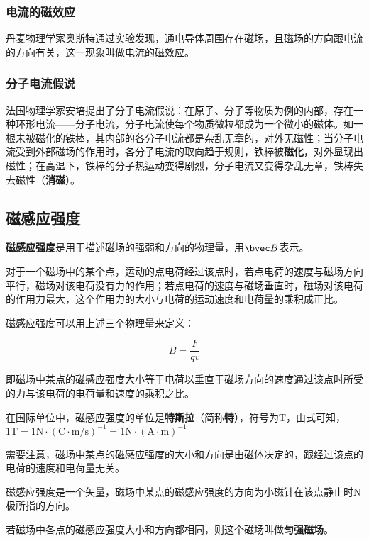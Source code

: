 \subsubsection{电流的磁效应}

丹麦物理学家奥斯特通过实验发现，通电导体周围存在磁场，且磁场的方向跟电流的方向有关，这一现象叫做电流的磁效应。

\subsubsection{分子电流假说}

法国物理学家安培提出了分子电流假说：在原子、分子等物质为例的内部，存在一种环形电流——分子电流，分子电流使每个物质微粒都成为一个微小的磁体。如一根未被磁化的铁棒，其内部的各分子电流都是杂乱无章的，对外无磁性；当分子电流受到外部磁场的作用时，各分子电流的取向趋于规则，铁棒被\textbf{磁化}，对外显现出磁性；在高温下，铁棒的分子热运动变得剧烈，分子电流又变得杂乱无章，铁棒失去磁性（\textbf{消磁}）。

\subsection{磁感应强度}

\textbf{磁感应强度}是用于描述磁场的强弱和方向的物理量，用$\bvec B$表示。

对于一个磁场中的某个点，运动的点电荷经过该点时，若点电荷的速度与磁场方向平行，磁场对该电荷没有力的作用；若点电荷的速度与磁场垂直时，磁场对该电荷的作用力最大，这个作用力的大小与电荷的运动速度和电荷量的乘积成正比。

磁感应强度可以用上述三个物理量来定义：

\begin{equation}
B=\frac{F}{qv}
\end{equation}

即磁场中某点的磁感应强度大小等于电荷以垂直于磁场方向的速度通过该点时所受的力与该电荷的电荷量和速度的乘积之比。

在国际单位中，磁感应强度的单位是\textbf{特斯拉}（简称\textbf{特}），符号为$\mathrm{T}$，由式可知，$1\mathrm{T}=1\mathrm{N}\cdot ( \mathrm{C \cdot \mathrm{m/s}})^{-1}= 1 \mathrm{N} \cdot ( \mathrm{A} \cdot \mathrm{m})^{-1}$

需要注意，磁场中某点的磁感应强度的大小和方向是由磁体决定的，跟经过该点的电荷的速度和电荷量无关。

磁感应强度是一个矢量，磁场中某点的磁感应强度的方向为小磁针在该点静止时$\mathrm{N}$极所指的方向。

若磁场中各点的磁感应强度大小和方向都相同，则这个磁场叫做\textbf{匀强磁场}。
